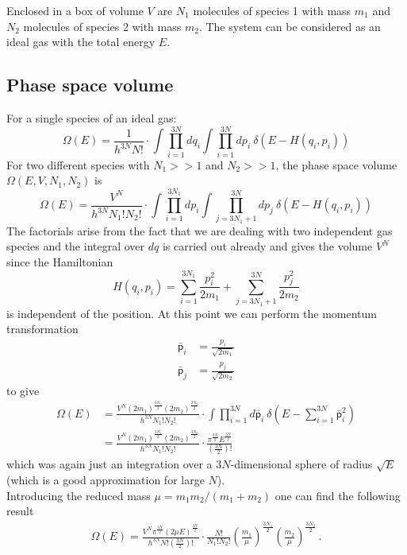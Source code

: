 Enclosed in a box of volume $V$ are $N_1$ molecules of species 1 with mass $m_1$
and $N_2$ molecules of species 2 with mass $m_2$. The system can be 
considered as an ideal gas with the total energy $E$.

\subsection{Phase space volume}
    For a single species of an ideal gas:
    \begin{equation}
        \Omega(E)=\frac{1}{h^{3N}N!}\cdot
        \int \prod_{i=1}^{3N} dq_i \int \prod_{i=1}^{3N} dp_i \ \delta\left(E - H(q_i, p_i)\right)
    \end{equation}
    For two different species with $N_1>>1$ and $N_2>>1$, 
    the phase space volume $\Omega(E,V,N_1,N_2)$ is
    \begin{equation}
        \Omega(E)=\frac{V^N}{h^{3N}N_1!N_2!}\cdot
        \int \prod_{i=1}^{3N_1} dp_i \int \prod_{j=3N_1+1}^{3N} dp_j \ \delta\left(E - H(q_i, p_i)\right)
    \end{equation}
    The factorials arise from the fact that we are dealing with two independent gas species and the integral over $dq$
    is carried out already and gives the volume $V^N$ since the Hamiltonian 
    \begin{equation}
    H(q_i, p_i) = \sum_{i=1}^{3N_1}\frac{p_i^2}{2m_1} + \sum_{j=3N_1+1}^{3N}\frac{p_j^2}{2m_2}
	\end{equation}        
    is independent of the position.
    At this point we can perform the momentum transformation
    \begin{align}
        \bar{\mathsf{p}}_i &= \frac{p_i}{\sqrt{2m_1}} \\
        \bar{\mathsf{p}}_j &= \frac{p_j}{\sqrt{2m_2}}
    \end{align}
    to give 
    \begin{align}
        \Omega(E)&=\frac{V^N (2m_1)^{\frac{3N_1}{2}} (2m_2)^{\frac{3N_2}{2}}}{h^{3N}N_1!N_2!}\cdot
        \int \prod_{i=1}^{3N} d\bar{\mathsf{p}}_i \ \delta\left(E - \sum_{i=1}^{3N}\bar{\mathsf{p}}_i^2\right) \\
        &=\frac{V^N (2m_1)^{\frac{3N_1}{2}} (2m_2)^{\frac{3N_2}{2}}}{h^{3N}N_1!N_2!}\cdot
        \frac{\pi^{\frac{3N}{2}} E^{\frac{3N}{2}}}{(\frac{3N}{2})!}
    \end{align}
    which was again just an integration over a $3N$-dimensional sphere of radius $\sqrt{E}$ (which is a good approximation for large $N$). \\
    Introducing the reduced mass $\mu = m_1 m_2 / (m_1 + m_2)$ one can find the following result
    \begin{align}
        \Omega(E)=\frac{V^N \pi^{\frac{3N}{2}} (2\mu E)^{\frac{3N}{2}}}{h^{3N}N!\left(\frac{3N}{2}\right)!}\cdot
        \frac{N!}{N_1!N_2!}\left( \frac{m_1}{\mu} \right)^{\frac{3N_1}{2}}\left( \frac{m_2}{\mu} \right)^{\frac{3N_2}{2}} \,.
    \end{align}
    

